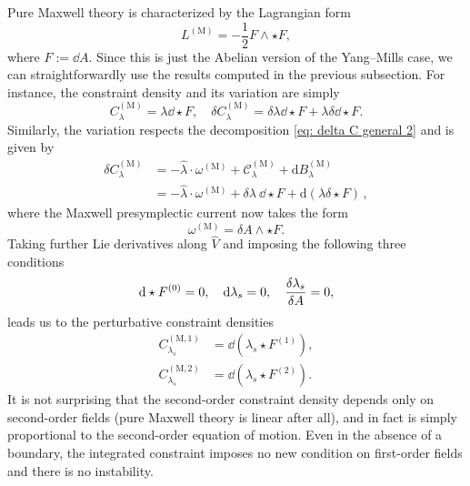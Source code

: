 \documentclass[]{jkpaper}
\theoremstyle{plain}
\theoremstyle{definition}
\newcommand{\sd}{\mathrm {d}}
\newcommand{\fd}{\delta}
\begin{document}
Pure Maxwell theory is characterized by the Lagrangian form
\begin{equation}
    L^{(\text{M})} = - \frac{1}{2} F \wedge \star F,
\end{equation}
where $F := \dd A$. Since this is just the Abelian version of the Yang--Mills case, we can straightforwardly use the results computed in the previous subsection. For instance, the constraint density and its variation are simply
\begin{equation}
    C_{\lambda}^{(\text{M})} = \lambda \dd \star F, \quad \delta C_{\lambda}^{(\text{M})} = \delta \lambda \dd \star F + \lambda \delta \dd \star F.
\end{equation}
Similarly, the variation respects the decomposition \eqref{eq: delta C general 2} and is given by 
\begin{equation}
    \begin{split}
        \delta C^{(\text{M})}_{\lambda} 
    &=-\hat{\lambda}\cdot \omega^{(\text{M})} + \mathcal{C}^{(\text{M})}_{\lambda}+\sd B^{(\text{M})}_\lambda\\
    &=-\hat{\lambda}\cdot \omega^{(\text{M})} + \delta\lambda ~\dd \star F +\sd(\lambda \fd \star F)\,,
    \end{split}
\end{equation}
where the Maxwell presymplectic current now takes the form
\begin{equation}
    \omega^{(\text{M})} = \delta A \wedge \star F.
\end{equation}
Taking further Lie derivatives along $\hat{V}$ and imposing the following three conditions
\begin{equation}
    \dd \star F^{(0)} = 0, \quad \dd \lambda_s = 0, \quad \fdv{\lambda_s}{A} = 0,
    \label{eq:maxwellConditions}
\end{equation}
leads us to the perturbative constraint densities
\begin{align}
    C_{\lambda_s}^{(\text{M},1)} &= \dd(\lambda_s \star F^{(1)}), \\
    C_{\lambda_s}^{(\text{M},2)} &= \dd(\lambda_s \star F^{(2)}).
\end{align}
It is not surprising that the second-order constraint density depends only on second-order fields (pure Maxwell theory is linear after all), and in fact is simply proportional to the second-order equation of motion. Even in the absence of a boundary, the integrated constraint imposes no new condition on first-order fields and there is no instability. 
\end{document}
